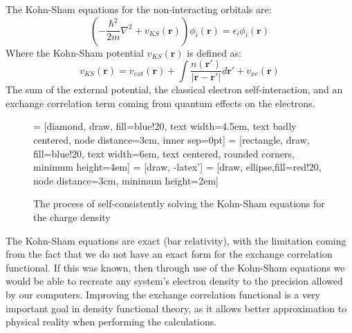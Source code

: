 \documentclass[12pt]{article}
\begin{document}
The Kohn-Sham equations for the non-interacting orbitals are:
\begin{equation}\label{eq:kohn-sham}
\left(-\frac{\hbar^2}{2m}\nabla^2 + v_{KS}(\mathbf r)\right)\phi_i(\mathbf r) = \epsilon_i \phi_i(\mathbf r)
\end{equation}
Where the Kohn-Sham potential $v_{KS}(\mathbf r)$ is defined as:
\begin{equation}\label{eq:kohn-shampotential}
v_{KS}(\mathbf r) = v_{ext}(\mathbf r) + \int \frac{n(\mathbf r')}{\left|\mathbf r - \mathbf {r'}\right|}d\mathbf {r'} + v_{xc}(\mathbf r)
\end{equation}
The sum of the external potential, the classical electron self-interaction, and an exchange correlation term coming from quantum effects on the electrons. 
\begin{figure}
\centering
	 = [diamond, draw, fill=blue!20, 
    text width=4.5em, text badly centered, node distance=3cm, inner sep=0pt]
 = [rectangle, draw, fill=blue!20, 
    text width=6em, text centered, rounded corners, minimum height=4em]
 = [draw, -latex']
 = [draw, ellipse,fill=red!20, node distance=3cm,
    minimum height=2em]
    
\caption{The process of self-consistently solving the Kohn-Sham equations for the charge density}
\end{figure}

The Kohn-Sham equations are exact (bar relativity), with the limitation coming from the fact that we do not have an exact form for the exchange correlation functional.
If this was known, then through use of the Kohn-Sham equations we would be able to recreate any system's electron density to the precision allowed by our computers.
Improving the exchange correlation functional is a very important goal in density functional theory, as it allows better approximation to physical reality when performing the calculations.
\end{document}
